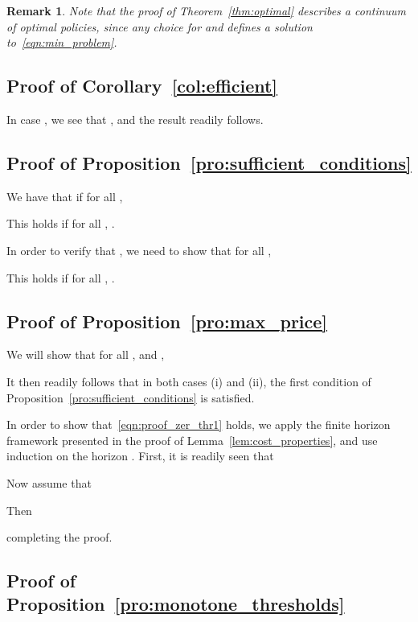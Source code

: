 \documentclass[journal]{IEEEtran}
\newcommand\1{\mathbf{1}}
\newtheorem{remark}{Remark}
\begin{document}
\begin{remark}
Note that the proof of Theorem~\ref{thm:optimal} describes a continuum of optimal policies, since any choice for  and  defines a solution to~\eqref{eqn:min_problem}.
\end{remark}

\subsection{Proof of Corollary~\ref{col:efficient}}

\begin{IEEEproof}
In case , we see that , and the result readily follows.
\end{IEEEproof}

\subsection{Proof of Proposition~\ref{pro:sufficient_conditions}}\label{sec:proof_sufficient}

\begin{IEEEproof}
We have that  if for all ,

This holds if  for all , .

In order to verify that , we need to show that for all ,

This holds if  for all , .
\end{IEEEproof}

\subsection{Proof of Proposition~\ref{pro:max_price}}\label{sec:proof_maxprice}

\begin{IEEEproof}
We will show that for all ,  and ,

It then readily follows that in both cases (i) and (ii), the first condition of Proposition~\ref{pro:sufficient_conditions} is satisfied.

In order to show that~\eqref{eqn:proof_zer_thr1} holds, we apply the finite horizon framework presented in the proof of Lemma~\ref{lem:cost_properties}, and use induction on the horizon . First, it is readily seen that

Now assume that

Then

completing the proof.
\end{IEEEproof}

\subsection{Proof of Proposition~\ref{pro:monotone_thresholds}}
\end{document}
